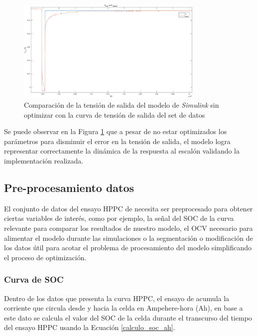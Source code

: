 \documentclass[10pt, a4paper]{report}
\begin{document}
\begin{figure}[h!]
    \begin{center}
        \includegraphics[width=0.8\textwidth]{v_sim_v_dataset_no_opt.eps}
        \caption{Comparaci\'on de la tensi\'on de salida del modelo de
                 \emph{Simulink} sin optimizar con la curva de tensi\'on de 
                 salida del set de datos}
         \label{comp_simulink_no_opt}
    \end{center}
\end{figure}

Se puede observar en la Figura \ref{comp_simulink_no_opt} que a pesar de no
estar optimizados los parámetros para disminuir el error en la tensi\'on de
salida, el modelo logra representar correctamente la din\'amica de la
respuesta al escal\'on validando la implementación realizada.


\subsection{Pre-procesamiento datos}\label{data_preprocessing}

El conjunto de datos del ensayo \acrshort{HPPC} de \cite{Kollmeyer2018} necesita
ser preprocesado para obtener ciertas variables de inter\'es, como por ejemplo,
la señal del \acrshort{SOC} de la curva relevante para comparar los resultados
de nuestro modelo, el \acrshort{OCV} necesario para alimentar el modelo durante
las simulaciones o la segmentaci\'on o modificaci\'on de los datos \'util para
acotar el problema de procesamiento del modelo simplificando el proceso de
optimización.

\subsubsection{Curva de \acrshort{SOC}}

Dentro de los datos que presenta la curva \acrshort{HPPC}, el ensayo de
\cite{Kollmeyer2018} acumula la corriente que circula desde y hacia la celda en
Ampehere-hora (Ah), en base a este dato se calcula el valor del \acrshort{SOC}
de la celda durante el transcurso del tiempo del ensayo \acrshort{HPPC} usando
la Ecuaci\'on \ref{calculo_soc_ah}.
\end{document}
